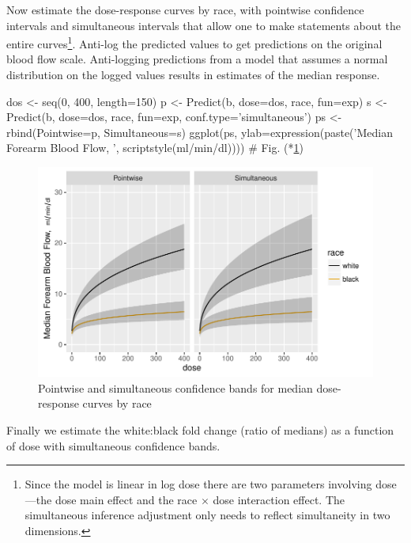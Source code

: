 Now estimate the dose-response curves by race, with pointwise 
confidence intervals and simultaneous intervals that allow one to make
statements about the entire curves\footnote{Since the model is linear
  in log dose there are two parameters involving dose---the dose main
  effect and the race $\times$ dose interaction effect.  The
  simultaneous inference adjustment only needs to reflect simultaneity in two
  dimensions.}.  Anti-log the predicted values to
get predictions on the original blood flow scale.  Anti-logging
predictions from a model that assumes a normal distribution on the
logged values results in estimates of the median response.
\begin{Schunk}
\begin{Sinput}
dos <- seq(0, 400, length=150)
p <- Predict(b, dose=dos, race, fun=exp)
s <- Predict(b, dose=dos, race, fun=exp, conf.type='simultaneous')
ps <- rbind(Pointwise=p, Simultaneous=s)
ggplot(ps, ylab=expression(paste('Median Forearm Blood Flow,  ',
                          scriptstyle(ml/min/dl))))   # Fig. (*\ref{fig:serial-glsd}\ipacue*)
\end{Sinput}
\begin{figure}[htbp]

\centerline{\includegraphics{serial-glsd-1} }

\caption[Confidence bands for median dose-response curves]{Pointwise and simultaneous confidence bands for median dose-response curves by race}\label{fig:serial-glsd}
\end{figure}
\end{Schunk}
Finally we estimate the white:black fold change (ratio of medians) as
a function of dose with simultaneous confidence bands.
